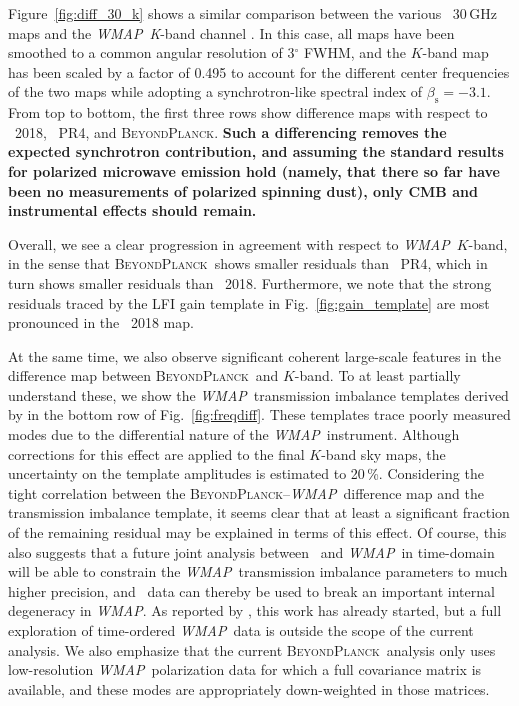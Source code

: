 \documentclass[twocolumn]{aa}
\def\WMAP{\textit{WMAP}}
\newcommand{\BP}{\textsc{BeyondPlanck}}
\begin{document}
Figure~\ref{fig:diff_30_k} shows a similar comparison between the
various \Planck\ 30\,GHz maps and the \WMAP\ \emph{K}-band channel
\citep{bennett2012}. In this case, all maps have been smoothed to a
common angular resolution of 3$^\circ$ FWHM, and the $K$-band map has
been scaled by a factor of 0.495 to account for the different center
frequencies of the two maps while adopting a synchrotron-like spectral
index of $\beta_{\mathrm{s}}=-3.1$. From top to bottom, the first
three rows show difference maps with respect to \Planck\ 2018, \Planck\ PR4,
and \BP. \textbf{Such a differencing removes the expected synchrotron
contribution, and assuming the standard results for polarized microwave
emission hold (namely, that there so far have been no measurements of polarized
spinning dust), only CMB and instrumental effects should remain.}

Overall, we see a clear progression in agreement with respect to
\WMAP\ $K$-band, in the sense that \BP\ shows smaller residuals than
\Planck\ PR4, which in turn shows smaller residuals than
\Planck\ 2018. Furthermore, we note that the strong residuals traced
by the LFI gain template in Fig.~\ref{fig:gain_template} are most
pronounced in the \Planck\ 2018 map.

At the same time, we also observe significant coherent large-scale
features in the difference map between \BP\ and $K$-band. To at least
partially understand these, we show the \WMAP\ transmission imbalance
templates derived by \citet{jarosik2007} in the bottom row of
Fig.~\ref{fig:freqdiff}. These templates trace poorly measured modes
due to the differential nature of the \WMAP\ instrument. Although
corrections for this effect are applied to the final $K$-band sky
maps, the uncertainty on the template amplitudes is estimated to
20\,\%. Considering the tight correlation between the
\BP--\WMAP\ difference map and the transmission imbalance template, it
seems clear that at least a significant fraction of the remaining
residual may be explained in terms of this effect. Of course, this
also suggests that a future joint analysis between \Planck\ and
\WMAP\ in time-domain will be able to constrain the
\WMAP\ transmission imbalance parameters to much higher precision, and
\Planck\ data can thereby be used to break an important internal
degeneracy in \WMAP. As reported by \citet{bp17}, this work has
already started, but a full exploration of time-ordered \WMAP\ data is
outside the scope of the current analysis. We also emphasize that the
current \BP\ analysis only uses low-resolution \WMAP\ polarization data
for which a full covariance matrix is available, and these modes are
appropriately down-weighted in those matrices.
\end{document}
